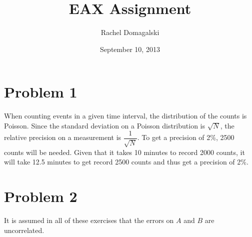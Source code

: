 \documentclass[11pt,letterpaper]{article}
\title{EAX Assignment}
\author{Rachel Domagalski}
\date{September 10, 2013}
\begin{document}
\maketitle

\section*{Problem 1}

When counting events in a given time interval, the distribution of the counts is
Poisson. Since the standard deviation on a Poisson distribution is $\sqrt{N}$,
the relative precision on a measurement is $\dfrac{1}{\sqrt{N}}$. To get a
precision of 2\%, 2500 counts will be needed. Given that it takes 10 minutes to
record 2000 counts, it will take 12.5 minutes to get record 2500 counts and thus
get a precision of 2\%.

\section*{Problem 2}

It is assumed in all of these exercises that the errors on $A$ and $B$ are
uncorrelated.
\end{document}
